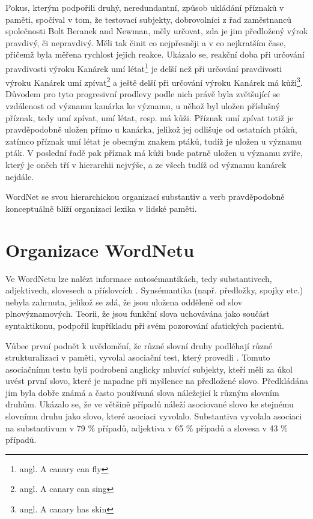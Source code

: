 \documentclass[a4paper, 11pt, oneside]{book}
\newcommand\ex{\textsf}
\begin{document}
				Pokus, kterým podpořili \textcite{collins1969retrieval} druhý, neredundantní, způsob ukládání příznaků v paměti, spočíval v tom, že testovací subjekty, dobrovolníci z řad zaměstnanců společnosti Bolt Beranek and Newman, měly určovat, zda je jim předložený výrok pravdivý, či nepravdivý. Měli tak činit co nejpřesněji a v co nejkratším čase, přičemž byla měřena rychlost jejich reakce. Ukázalo se, reakční doba při určování pravdivosti výroku \ex{Kanárek umí létat}\footnote{angl. \ex{A canary can fly}} je delší než při určování pravdivosti výroku \ex{Kanárek umí zpívat}\footnote{angl. \ex{A canary can sing}} a ještě delší při určování výroku \ex{Kanárek má kůži}\footnote{angl. \ex{A canary has skin}}. Důvodem pro tyto progresivní prodlevy podle nich právě byla zvětšující se vzdálenost od významu \ex{kanárka} ke významu, u něhož byl uložen příslušný příznak, tedy \ex{umí zpívat}, \ex{umí létat}, resp. \ex{má kůži}. Příznak \ex{umí zpívat} totiž je pravděpodobně uložen přímo u \ex{kanárka}, jelikož jej odlišuje od ostatních ptáků, zatímco příznak \ex{umí létat} je obecným znakem ptáků, tudíž je uložen u významu \ex{pták}. V poslední řadě pak příznak \ex{má kůži} bude patrně uložen u významu \ex{zvíře}, který je oněch tří v hierarchii nejvýše, a ze všech tudíž od významu \ex{kanárek} nejdále.

				WordNet se svou hierarchickou organizací substantiv a verb pravděpodobně konceptuálně blíží organizaci lexika v lidské paměti.
			

			\section{Organizace WordNetu}

				Ve WordNetu lze nalézt informace autosémantikách, tedy substantivech, adjektivech, slovesech a příslovcích \parencite{vossen1998introduction}. Synsémantika (např. předložky, spojky etc.) nebyla zahrnuta, jelikož se zdá, že jsou uložena odděleně od slov plnovýznamových. Teorii, že jsou funkční slova uchovávána jako součást syntaktikonu, podpořil kupříkladu \textcite{garrett1982production} při svém pozorování afatických pacientů. 

				Vůbec první podnět k uvědomění, že různé slovní druhy podléhají různé strukturalizaci v paměti, vyvolal asociační test, který provedli \textcite{fillenbaum1965grammatical}. Tomuto asociačnímu testu byli podrobeni anglicky mluvící subjekty, kteří měli za úkol uvést první slovo, které je napadne při myšlence na předložené slovo. Předkládána jim byla dobře známá a často používaná slova náležející k různým slovním druhům. Ukázalo se, že ve většině případů náleží asociované slovo ke stejnému slovnímu druhu jako slovo, které asociaci vyvolalo. Substantiva vyvolala asociaci na substantivum v 79 \% případů, adjektiva v 65 \% případů a slovesa v 43 \% případů. 
\end{document}
